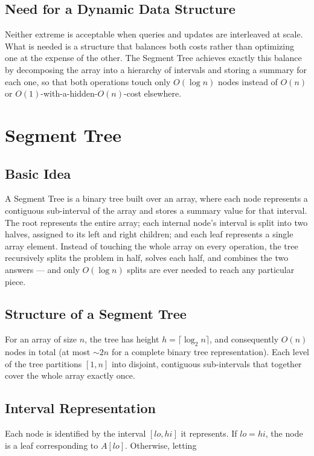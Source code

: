 \documentclass[11pt]{article}
\begin{document}
\subsection{Need for a Dynamic Data Structure}
Neither extreme is acceptable when queries and updates are interleaved at scale. What is needed is a structure that balances both costs rather than optimizing one at the expense of the other. The Segment Tree achieves exactly this balance by decomposing the array into a hierarchy of intervals and storing a summary for each one, so that both operations touch only $O(\log n)$ nodes instead of $O(n)$ or $O(1)$-with-a-hidden-$O(n)$-cost elsewhere.

\section{Segment Tree}

\subsection{Basic Idea}
A Segment Tree is a binary tree built over an array, where each node represents a contiguous sub-interval of the array and stores a summary value for that interval. The root represents the entire array; each internal node's interval is split into two halves, assigned to its left and right children; and each leaf represents a single array element. Instead of touching the whole array on every operation, the tree recursively splits the problem in half, solves each half, and combines the two answers --- and only $O(\log n)$ splits are ever needed to reach any particular piece.

\subsection{Structure of a Segment Tree}
For an array of size $n$, the tree has height $h = \lceil \log_2 n \rceil$, and consequently $O(n)$ nodes in total (at most $\sim\!2n$ for a complete binary tree representation). Each level of the tree partitions $[1,n]$ into disjoint, contiguous sub-intervals that together cover the whole array exactly once.

\subsection{Interval Representation}
Each node is identified by the interval $[lo, hi]$ it represents. If $lo = hi$, the node is a leaf corresponding to $A[lo]$. Otherwise, letting
\end{document}
